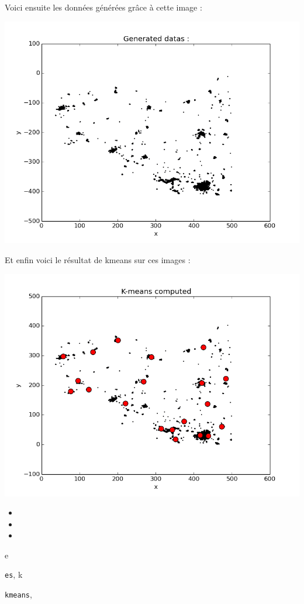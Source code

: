 \documentclass[letterpaper,10pt,english]{sphinxmanual}
\begin{document}
Voici ensuite les données générées grâce à cette image :

{\hfill\includegraphics{bretagne_genData.png}\hfill}

Et enfin voici le résultat de kmeans sur ces images :

{\hfill\includegraphics{bretagne_traitedData.png}\hfill}
\begin{itemize}
\item {} 

\item {} 

\item {} 

\end{itemize}


\renewcommand{\indexname}{Python Module Index}
\begin{theindex}
\def\bigletter#1{{\Large\sffamily#1}\nopagebreak\vspace{1mm}}
\bigletter{e}
\item {\texttt{es}}, \pageref{data:module-es}
\indexspace
\bigletter{k}
\item {\texttt{kmeans}}, \pageref{impl:module-kmeans}
\end{theindex}

\renewcommand{\indexname}{Index}
\printindex
\end{document}
